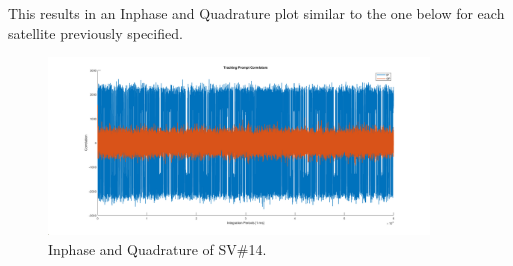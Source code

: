 \documentclass[11pt]{article}
\begin{document}
\begin{enumerate}[label=\textbf{\arabic*.}]
This results in an Inphase and Quadrature plot similar to the one below for each satellite 
previously specified.
    \begin{figure}[H]
        \centering
        \includegraphics[width=0.9\textwidth]{Lab_4_IQ.png}
        \caption{Inphase and Quadrature of SV\#14.}
    \end{figure}


\end{enumerate}
\end{document}
